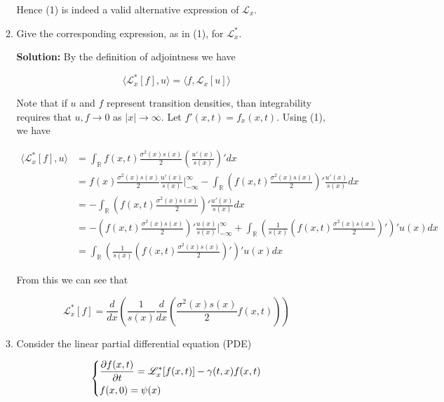 \documentclass[12pt, a4paper]{article}
\begin{document}
\begin{enumerate}
\begin{enumerate}
        Hence (1) is indeed a valid alternative expression of $\mathscr L_x$. 

        \item Give the corresponding expression, as in (1), for $\mathscr L_x^*$. 

        \textbf{Solution:} By the definition of adjointness we have 

        $$\langle \mathscr L_x^*[f], u \rangle = \langle f, \mathscr L_x[u]\rangle$$

        Note that if $u$ and $f$ represent transition densities, than integrability requires that $u, f \rightarrow 0$ as $|x| \rightarrow \infty$. Let $f'(x,t) = f_x(x,t)$. Using (1), we have 

        \begin{align*}
            \langle \mathscr L_x^*[f], u \rangle &= \int_{\mathbb R} f(x,t) \frac{\sigma^2(x) s(x)}{2} \left( \frac{u'(x)}{s(x)} \right)' dx\\
            &= f(x) \frac{\sigma^2(x) s(x)}{2} \frac{u'(x)}{s(x)} \Bigg|_{-\infty}^\infty - \int_{\mathbb R} \left( f(x,t) \frac{\sigma^2(x)s(x)}{2} \right)' \frac{u'(x)}{s(x)}dx \\
            &= - \int_{\mathbb R} \left( f(x,t) \frac{\sigma^2(x)s(x)}{2} \right)' \frac{u'(x)}{s(x)}dx \\
            &= - \left( f(x,t) \frac{\sigma^2(x)s(x)}{2} \right)' \frac{u(x)}{s(x)} \Bigg|_{-\infty}^\infty + \int_{\mathbb R} \left(\frac{1}{s(x)} \left( f(x,t) \frac{\sigma^2(x)s(x)}{2} \right)' \right)' u(x) dx \\
            &= \int_{\mathbb R} \left(\frac{1}{s(x)} \left( f(x,t) \frac{\sigma^2(x)s(x)}{2} \right)' \right)' u(x) dx
        \end{align*}

        From this we can see that 

        $$\mathscr L_x^*[f] = \frac{d}{d x} \left( \frac{1}{s(x)} \frac{d}{d x} \left( \frac{\sigma^2(x) s(x)}{2} f(x,t) \right) \right)$$

        \item Consider the linear partial differential equation (PDE) 
        
        \begin{align}
            \begin{dcases}
                \frac{\partial f(x,t)}{\partial t} = \mathscr L_x^*[f(x,t)]-\gamma(t,x) f(x,t)\\
            f(x,0) = \psi(x) 
            \end{dcases}
        \end{align}


\end{enumerate}
\end{enumerate}
\end{document}
